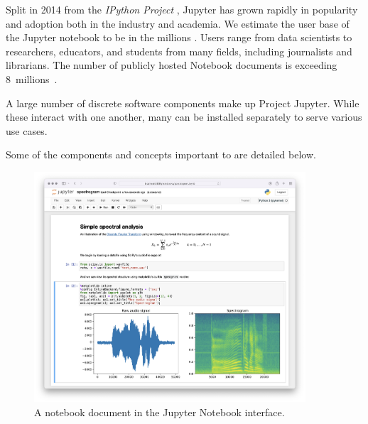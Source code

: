 Split in 2014 from the \emph{IPython Project} \cite{IPython}, Jupyter has grown
rapidly in popularity and adoption both in the industry and academia. We
estimate the user base of the Jupyter notebook to be in the millions
\cite{jupyter-grant}. Users range from data scientists to researchers,
educators, and students from many fields, including journalists and librarians.
The number of publicly hosted Notebook documents is exceeding 8~millions~\cite{notebookcount}.

%

A large number of discrete software components make up Project Jupyter.
While these interact with one another, many can be installed separately
to serve various use cases.


Some of the components and concepts important to \TheProject are detailed below.

\begin{figure}[ht]\centering
  \centering
  \includegraphics[width=0.9\textwidth]{images/spectrogram.png}
  \caption{A notebook document in the Jupyter Notebook interface.}\label{fig:notebook-screenshot}
\end{figure}

